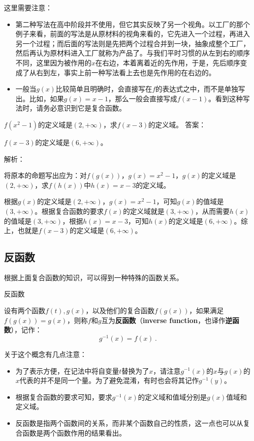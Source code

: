 这里需要注意：
\begin{itemize}
\item 第二种写法在高中阶段并不使用，但它其实反映了另一个视角。以工厂的那个例子来看，前面的写法是从原材料的视角来看的，它先进入一个过程，再进入另一个过程；而后面的写法则是先把两个过程合并到一块，抽象成整个工厂，然后再认为原材料进入工厂就称为产品了。与我们平时习惯的从左到右的顺序不同，这里因为被作用的$x$在右边，本着离着近的先作用，于是，先后顺序变成了从右到左，事实上前一种写法看上去也是先作用的在右边的。
\item 一般当$g(x)$比较简单且明确时，会直接写在$f$的表达式之中，而不是单独写出。比如，如果$g(x)=x-1$，那么一般会直接写成$f(x-1)$。看到这种写法时，请务必意识到它是复合函数。
\end{itemize}

\begin{exercise}{$f(x^2-1)$的定义域是$(2,+\infty)$，求$f(x-3)$的定义域。}
答案：

$f(x-3)$的定义域是$(6,+\infty)$。

解析：

将原本的命题写出应为：对$f(g(x))$，$g(x)=x^2-1$，$g(x)$的定义域是$(2,+\infty)$，求$f(h(x))$中$h(x)=x-3$的定义域。

根据$g(x)$的定义域是$(2,+\infty)$，$g(x)=x^2-1$，可知$g(x)$的值域是$(3,+\infty)$。根据复合函数的要求$f(x)$的定义域就是$(3,+\infty)$，从而需要$h(x)$的值域是$(3,+\infty)$，根据$h(x)=x-3$，可知$h(x)$的定义域是$(6,+\infty)$。综上，也就是$f(x-3)$的定义域是$(6,+\infty)$。

\end{exercise}

\subsection{反函数}

根据上面复合函数的知识，可以得到一种特殊的函数关系。

\begin{definition}{反函数}

设有两个函数$f(t),g(x)$，以及他们的复合函数$f(g(x))$，如果满足$f(g(x))=g(x)$，则称$f$和$g$互为\textbf{反函数}（\textbf{inverse function}，也译作\textbf{逆函数}），记作：
\begin{equation}
g^{-1}(x)=f(x)~.
\end{equation}
\end{definition}

关于这个概念有几点注意：
\begin{itemize}
\item 为了表示方便，在记法中将自变量$t$替换为了$x$，请注意$g^{-1}(x)$的$x$与$g(x)$的$x$代表的并不是同一个量。为了避免混淆，有时也会将其记作$g^{-1}(y)$。
\item 根据复合函数的要求可知，要求$g^{-1}(x)$的定义域和值域分别是$g(x)$值域和定义域。
\item 反函数是指两个函数间的关系，而非某个函数自己的性质，这一点也可以从复合函数是两个函数作用的结果看出。
\end{itemize}


